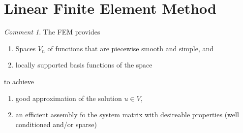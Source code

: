 \documentclass[english]{article}
\theoremstyle{definition}
\theoremstyle{remark}
\newtheorem*{comm}{Comment}
\begin{document}
\section{Linear Finite Element Method}
  \begin{comm}
    The FEM provides
    \begin{enumerate}
    \item Spaces $V_n$ of functions that are piecewise smooth and simple, and
    \item locally supported basis functions of the space
    \end{enumerate}
    to achieve
    \begin{enumerate}
    \item good approximation of the solution $u \in V$,
    \item an efficient assembly fo the system matrix with desireable properties (well conditioned and/or sparse)
    \end{enumerate}
  \end{comm}
\end{document}
